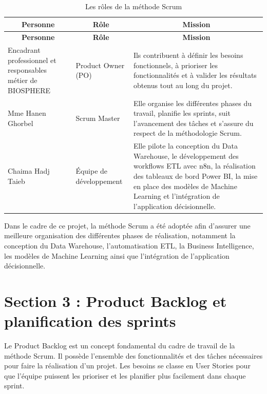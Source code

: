 \begin{longtable}{|p{3.5cm}|p{3cm}|p{9cm}|}

\caption{Les rôles de la méthode Scrum} \\

\hline
\multicolumn{1}{|c|}{\textbf{Personne}} & 
\multicolumn{1}{c|}{\textbf{Rôle}} & 
\multicolumn{1}{c|}{\textbf{Mission}} \\
\hline
\endfirsthead

\hline
\multicolumn{1}{|c|}{\textbf{Personne}} & 
\multicolumn{1}{c|}{\textbf{Rôle}} & 
\multicolumn{1}{c|}{\textbf{Mission}} \\
\hline
\endhead
\hline
\endfoot

Encadrant professionnel et responsables métier de BIOSPHERE & Product Owner (PO) & Ils contribuent à définir les besoins fonctionnels, à prioriser les fonctionnalités et à valider les résultats obtenus tout au long du projet. \\
\hline

Mme Hanen Ghorbel & Scrum Master & Elle organise les différentes phases du travail, planifie les sprints, suit l'avancement des tâches et s'assure du respect de la méthodologie Scrum. \\
\hline

Chaima Hadj Taieb & Équipe de développement & Elle pilote la conception du Data Warehouse, le développement des workflows ETL avec n8n, la réalisation des tableaux de bord Power BI, la mise en place des modèles de Machine Learning et l'intégration de l'application décisionnelle. \\
\hline
\end{longtable}

Dans le cadre de ce projet, la méthode Scrum a été adoptée afin d’assurer une meilleure organisation des différentes phases de réalisation, notamment la conception du Data Warehouse, l’automatisation ETL, la Business Intelligence, les modèles de Machine Learning ainsi que l’intégration de l’application décisionnelle.

\section{Section 3 : Product Backlog et planification des sprints}
Le Product Backlog est un concept fondamental du cadre de travail de la méthode Scrum. Il possède l'ensemble des fonctionnalités et des tâches nécessaires pour faire la réalisation d’un projet. Les besoins se classe en User Stories pour que l’équipe puissent les prioriser et les planifier plus facilement dans chaque sprint.
